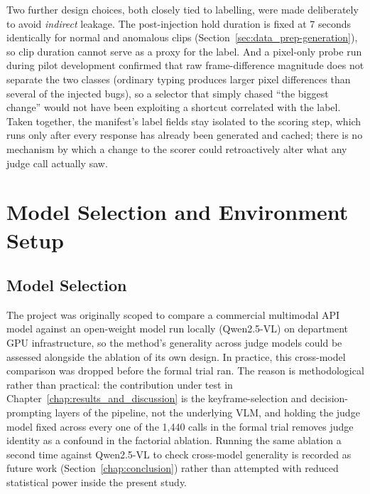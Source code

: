 Two further design choices, both closely tied to labelling, were made deliberately to avoid \emph{indirect} leakage. The post-injection hold duration is fixed at 7 seconds identically for normal and anomalous clips (Section~\ref{sec:data_prep-generation}), so clip duration cannot serve as a proxy for the label. And a pixel-only probe run during pilot development confirmed that raw frame-difference magnitude does not separate the two classes (ordinary typing produces larger pixel differences than several of the injected bugs), so a selector that simply chased ``the biggest change'' would not have been exploiting a shortcut correlated with the label. Taken together, the manifest's label fields stay isolated to the scoring step, which runs only after every response has already been generated and cached; there is no mechanism by which a change to the scorer could retroactively alter what any judge call actually saw.

\section{Model Selection and Environment Setup}
\label{sec:env_setup}

\subsection{Model Selection}
\label{sec:env_setup-model}
The project was originally scoped to compare a commercial multimodal API model against an open-weight model run locally (Qwen2.5-VL) on department GPU infrastructure, so the method's generality across judge models could be assessed alongside the ablation of its own design. In practice, this cross-model comparison was dropped before the formal trial ran. The reason is methodological rather than practical: the contribution under test in Chapter~\ref{chap:results_and_discussion} is the keyframe-selection and decision-prompting layers of the pipeline, not the underlying VLM, and holding the judge model fixed across every one of the 1{,}440 calls in the formal trial removes judge identity as a confound in the factorial ablation. Running the same ablation a second time against Qwen2.5-VL to check cross-model generality is recorded as future work (Section~\ref{chap:conclusion}) rather than attempted with reduced statistical power inside the present study.

